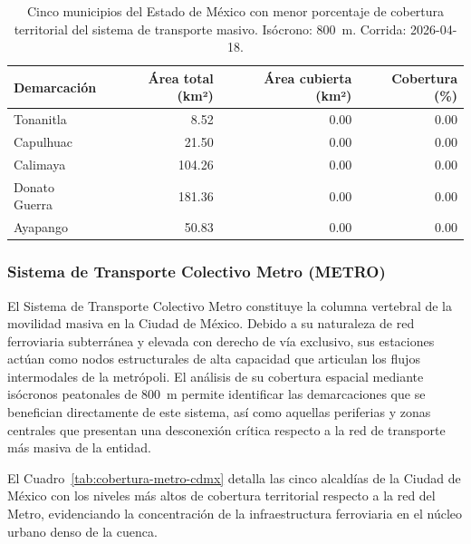 \begin{table}[H]
    \centering
    \caption[Municipios del EDOMEX con menor cobertura de transporte masivo]{
    Cinco municipios del Estado de México con menor porcentaje de cobertura
    territorial del sistema de transporte masivo. Isócrono: 800~m.
    Corrida: 2026-04-18.}
    \label{tab:peores-edomex}
    \begin{tabular}{|l|r|r|r|}
        \hline
        \textbf{Demarcación} & \textbf{Área total (km²)} &
        \textbf{Área cubierta (km²)} & \textbf{Cobertura (\%)} \\
        \hline
        Tonanitla       &   8.52 & 0.00 & 0.00 \\
        Capulhuac       &  21.50 & 0.00 & 0.00 \\
        Calimaya        & 104.26 & 0.00 & 0.00 \\
        Donato Guerra   & 181.36 & 0.00 & 0.00 \\
        Ayapango        &  50.83 & 0.00 & 0.00 \\
        \hline
    \end{tabular}
\end{table}


\subsubsection{Sistema de Transporte Colectivo Metro (METRO)}
\label{subsubsec:cobertura-metro}

El Sistema de Transporte Colectivo Metro constituye la columna vertebral de la
movilidad masiva en la Ciudad de México. Debido a su naturaleza de red ferroviaria
subterránea y elevada con derecho de vía exclusivo, sus estaciones actúan como
nodos estructurales de alta capacidad que articulan los flujos intermodales de la
metrópoli. El análisis de su cobertura espacial mediante isócronos peatonales de
800~m permite identificar las demarcaciones que se benefician directamente de este
sistema, así como aquellas periferias y zonas centrales que presentan una
desconexión crítica respecto a la red de transporte más masiva de la entidad.

El Cuadro~\ref{tab:cobertura-metro-cdmx} detalla las cinco alcaldías de la Ciudad de
México con los niveles más altos de cobertura territorial respecto a la red del
Metro, evidenciando la concentración de la infraestructura ferroviaria en el núcleo
urbano denso de la cuenca.

